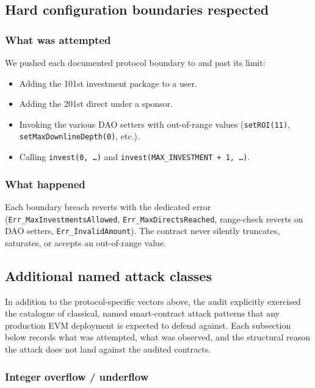 \documentclass[11pt,a4paper]{article}
\begin{document}
\subsection{Hard configuration boundaries respected}

\subsubsection*{What was attempted}

We pushed each documented protocol boundary to and past its limit:

\begin{itemize}[leftmargin=*]
    \item Adding the 101st investment package to a user.
    \item Adding the 201st direct under a sponsor.
    \item Invoking the various DAO setters with out-of-range values
          (\texttt{setROI(11)}, \texttt{setMaxDownlineDepth(0)}, etc.).
    \item Calling \texttt{invest(0, \dots)} and
          \texttt{invest(MAX\_INVESTMENT + 1, \dots)}.
\end{itemize}

\subsubsection*{What happened}

Each boundary breach reverts with the dedicated error
(\texttt{Err\_MaxInvestmentsAllowed},
\texttt{Err\_MaxDirectsReached}, range-check reverts on DAO setters,
\texttt{Err\_InvalidAmount}). The contract never silently truncates,
saturates, or accepts an out-of-range value.

\subsection{Additional named attack classes}

In addition to the protocol-specific vectors above, the audit explicitly
exercised the catalogue of classical, named smart-contract attack patterns
that any production EVM deployment is expected to defend against. Each
subsection below records what was attempted, what was observed, and the
structural reason the attack does not land against the audited contracts.

\subsubsection*{Integer overflow / underflow}
\end{document}
